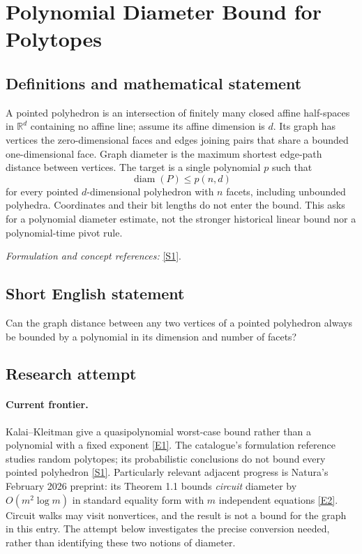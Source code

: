 \documentclass[11pt,a4paper]{article}
\newcommand{\R}{\mathbb{R}}
\newcommand{\sref}[2]{\hyperlink{source:#1:#2}{[S#2]}}
\newcommand{\eref}[2]{\hyperlink{extra:#1:#2}{[E#2]}}
\newif\ifshowcatalogue
\newcommand{\cataloguescope}[1]{\ifshowcatalogue
 \paragraph{Exact scope in the supplied catalogue.}
 \begin{quote}\small #1\end{quote}\fi}
\begin{document}
\setcounter{section}{212}
\clearpage
\section{\texorpdfstring{Polynomial Diameter Bound for Polytopes}{Polynomial Diameter Bound for Polytopes}}\label{213}
\subsection{Definitions and mathematical statement}
A pointed polyhedron is an intersection of finitely many closed affine half-spaces in $\R^d$ containing no affine line; assume its affine dimension is $d$. Its graph has vertices the zero-dimensional faces and edges joining pairs that share a bounded one-dimensional face. Graph diameter is the maximum shortest edge-path distance between vertices. The target is a single polynomial $p$ such that
\[
 \operatorname{diam}(P)\le p(n,d)
\]
for every pointed $d$-dimensional polyhedron with $n$ facets, including unbounded polyhedra. Coordinates and their bit lengths do not enter the bound. This asks for a polynomial diameter estimate, not the stronger historical linear bound nor a polynomial-time pivot rule.
\par\smallskip\textit{Formulation and concept references:} \sref{213}{1}.
\cataloguescope{Prove or disprove that there is a polynomial p such that the vertex-edge graph of every pointed d-dimensional polyhedron, bounded or unbounded, with n facets has diameter at most p(n,d).}
\subsection{Short English statement}
Can the graph distance between any two vertices of a pointed polyhedron always be bounded by a polynomial in its dimension and number of facets?
\subsection{Research attempt}

\paragraph{Current frontier.}
Kalai--Kleitman give a quasipolynomial worst-case bound rather than a
polynomial with a fixed exponent \eref{213}{1}. The catalogue's formulation
reference studies random polytopes; its probabilistic conclusions do not
bound every pointed polyhedron \sref{213}{1}. Particularly relevant adjacent
progress is Natura's February 2026 preprint: its Theorem 1.1 bounds
\emph{circuit} diameter by $O(m^2\log m)$ in standard equality form with
$m$ independent equations \eref{213}{2}. Circuit walks may visit nonvertices,
and the result is not a bound for the graph in this entry. The attempt below
investigates the precise conversion needed, rather than identifying these
two notions of diameter.
\end{document}
